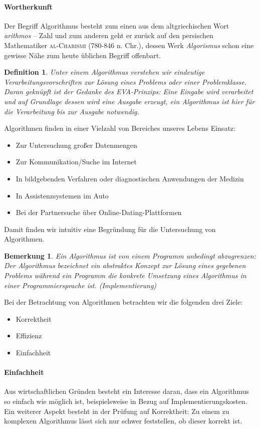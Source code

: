 \documentclass[11pt,a4paper]{scrartcl}
\newtheorem{note}{Bemerkung}
\newtheorem{definition}{Definition}
\begin{document}
\paragraph{Wortherkunft}
Der Begriff {\glqq}Algorithmus{\grqq} besteht zum einen aus dem altgriechischen Wort \textit{arithmos} -- Zahl und zum anderen geht er zurück auf den persischen Mathematiker \textsc{al-Charismi} (780-846 n. Chr.), dessen Werk \textit{{\glqq}Algorismus{\grqq}} schon eine gewisse Nähe zum heute üblichen Begriff offenbart. \parencite{brockhaus:algorithmus}
\begin{definition}
Unter einem Algorithmus verstehen wir eindeutige Verarbeitungsvorschriften zur Lösung eines Problems oder einer Problemklasse. Daran geknüpft ist der Gedanke des EVA-Prinzips: Eine Eingabe wird verarbeitet und auf Grundlage dessen wird eine Ausgabe erzeugt, ein Algorithmus ist hier für die Verarbeitung bis zur Ausgabe notwendig. 
\end{definition}
Algorithmen finden in einer Vielzahl von Bereiches unseres Lebens Einsatz: 
\begin{itemize}
\item Zur Untersuchung großer Datenmengen
\item Zur Kommunikation/Suche im Internet
\item In bildgebenden Verfahren oder diagnostischen Anwendungen der Medizin
\item In Assistenzsystemen im Auto
\item Bei der Partnersuche über Online-Dating-Plattformen
\end{itemize}
Damit finden wir intuitiv eine Begründung für die Untersuchung von Algorithmen.
\begin{note}
Ein \textit{Algorithmus} ist von einem \textit{Programm} unbedingt abzugrenzen: Der Algorithmus bezeichnet ein abstraktes Konzept zur Lösung eines gegebenen Problems während ein Programm die konkrete Umsetzung eines Algorithmus in einer Programmiersprache ist. (Implementierung) 
\end{note}
Bei der Betrachtung von Algorithmen betrachten wir die folgenden drei Ziele:
\begin{itemize}
\item Korrektheit
\item Effizienz
\item Einfachheit
\end{itemize}
\paragraph{Einfachheit}
Aus wirtschaftlichen Gründen besteht ein Interesse daran, dass ein Algorithmus so einfach wie möglich ist, beispielsweise in Bezug auf Implementierungskosten. Ein weiterer Aspekt besteht in der Prüfung auf Korrektheit: Zu einem zu komplexen Algorithmus lässt sich nur schwer feststellen, ob dieser korrekt ist.
\end{document}
